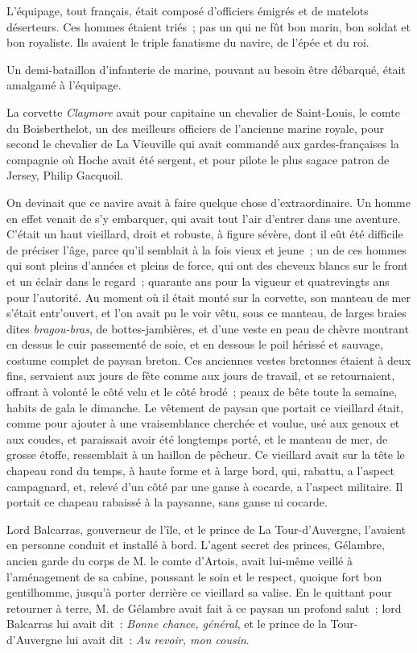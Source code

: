 \documentclass[french,twoside]{book} %
\begin{document}
L’équipage, tout français, était composé d’officiers émigrés et de matelots déserteurs. Ces hommes étaient triés ; pas un qui ne fût bon marin, bon soldat et bon royaliste. Ils avaient le triple fanatisme du navire, de l’épée et du roi.\par
Un demi-bataillon d’infanterie de marine, pouvant au besoin être débarqué, était amalgamé à l’équipage.\par
La corvette \emph{Claymore} avait pour capitaine un chevalier de Saint-Louis, le comte du Boisberthelot, un des meilleurs officiers de l’ancienne marine royale, pour second le chevalier de La Vieuville qui avait commandé aux gardes-françaises la compagnie où Hoche avait été sergent, et pour pilote le plus sagace patron de Jersey, Philip Gacquoil.\par
On devinait que ce navire avait à faire quelque chose d’extraordinaire. Un homme en effet venait de s’y embarquer, qui avait tout l’air d’entrer dans une aventure. C’était un haut vieillard, droit et robuste, à figure sévère, dont il eût été difficile de préciser l’âge, parce qu’il semblait à la fois vieux et jeune ; un de ces hommes qui sont pleins d’années et pleins de force, qui ont des cheveux blancs sur le front et un éclair dans le regard ; quarante ans pour la vigueur et quatrevingts ans pour l’autorité. Au moment où il était monté sur la corvette, son manteau de mer s’était entr’ouvert, et l’on avait pu le voir vêtu, sous ce manteau, de larges braies dites \emph{bragou-bras}, de  bottes-jambières, et d’une veste en peau de chèvre montrant en dessus le cuir passementé de soie, et en dessous le poil hérissé et sauvage, costume complet de paysan breton. Ces anciennes vestes bretonnes étaient à deux fins, servaient aux jours de fête comme aux jours de travail, et se retournaient, offrant à volonté le côté velu et le côté brodé ; peaux de bête toute la semaine, habits de gala le dimanche. Le vêtement de paysan que portait ce vieillard était, comme pour ajouter à une vraisemblance cherchée et voulue, usé aux genoux et aux coudes, et paraissait avoir été longtemps porté, et le manteau de mer, de grosse étoffe, ressemblait à un haillon de pêcheur. Ce vieillard avait sur la tête le chapeau rond du temps, à haute forme et à large bord, qui, rabattu, a l’aspect campagnard, et, relevé d’un côté par une ganse à cocarde, a l’aspect militaire. Il portait ce chapeau rabaissé à la paysanne, sans ganse ni cocarde.\par
Lord Balcarras, gouverneur de l’île, et le prince de La Tour-d’Auvergne, l’avaient en personne conduit et installé à bord. L’agent secret des princes, Gélambre, ancien garde du corps de M. le comte d’Artois, avait lui-même veillé à l’aménagement de sa cabine, poussant le soin et le respect, quoique fort bon gentilhomme, jusqu’à porter derrière ce vieillard sa valise. En le quittant pour retourner à terre, M. de Gélambre avait fait à ce paysan un profond salut ; lord Balcarras lui avait dit : \emph{Bonne chance, général}, et le prince de la Tour-d’Auvergne lui avait dit : \emph{Au revoir, mon cousin}.\par
\end{document}
